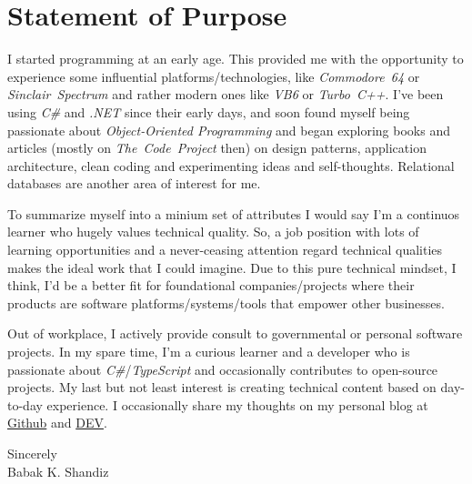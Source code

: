 \documentclass[10pt,a4paper]{article}
\begin{document}


\section*{Statement of Purpose}

I started programming at an early age. This provided me with the opportunity
to experience some influential platforms/technologies, like
\textit{Commodore~64} or \textit{Sinclair~Spectrum} and rather modern ones
like \textit{VB6} or \textit{Turbo~C++}. I've been using \textit{C\#} and
\textit{.NET} since their early days, and soon found myself being passionate
about \textit{Object-Oriented Programming} and began exploring books and
articles (mostly on \textit{The~Code~Project} then) on design patterns,
application architecture, clean coding and experimenting ideas and
self-thoughts. Relational databases are another area of interest for me.

To summarize myself into a minium set of attributes I would say I'm a
continuos learner who hugely values technical quality. So, a job position with
lots of learning opportunities and a never-ceasing attention regard technical
qualities makes the ideal work that I could imagine. Due to this pure technical
mindset, I think, I'd be a better fit for foundational companies/projects where
their products are software platforms/systems/tools that empower other
businesses.

Out of workplace, I actively provide consult to governmental or personal
software projects. In my spare time, I'm a curious learner and a developer who
is passionate about \textit{C\#}/\textit{TypeScript} and occasionally
contributes to open-source projects. My last but not least interest is
creating technical content based on day-to-day experience. I occasionally
share my thoughts on my personal blog at
\href{https://babakks.github.io}{Github} and
\href{https://dev.to/babakks}{DEV}.

\vspace{2em}
\noindent
Sincerely \\
\noindent
Babak K. Shandiz
\end{document}
